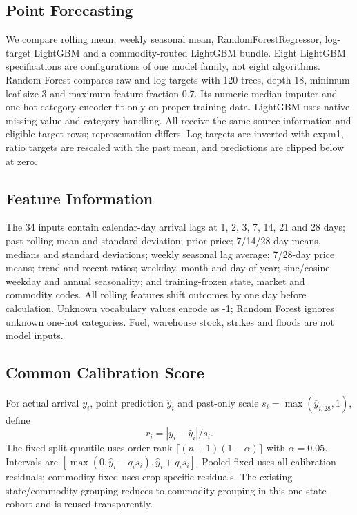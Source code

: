 \documentclass[conference]{IEEEtran}
\begin{document}
\subsection{Point Forecasting}
We compare rolling mean, weekly seasonal mean, RandomForestRegressor, log-target LightGBM and a commodity-routed LightGBM bundle. Eight LightGBM specifications are configurations of one model family, not eight algorithms. Random Forest compares raw and log targets with 120 trees, depth 18, minimum leaf size 3 and maximum feature fraction 0.7. Its numeric median imputer and one-hot category encoder fit only on proper training data. LightGBM uses native missing-value and category handling. All receive the same source information and eligible target rows; representation differs. Log targets are inverted with expm1, ratio targets are rescaled with the past mean, and predictions are clipped below at zero.
\subsection{Feature Information}
The 34 inputs contain calendar-day arrival lags at 1, 2, 3, 7, 14, 21 and 28 days; past rolling mean and standard deviation; prior price; 7/14/28-day means, medians and standard deviations; weekly seasonal lag average; 7/28-day price means; trend and recent ratios; weekday, month and day-of-year; sine/cosine weekday and annual seasonality; and training-frozen state, market and commodity codes. All rolling features shift outcomes by one day before calculation. Unknown vocabulary values encode as -1; Random Forest ignores unknown one-hot categories. Fuel, warehouse stock, strikes and floods are not model inputs.
\subsection{Common Calibration Score}
For actual arrival $y_i$, point prediction $\hat y_i$ and past-only scale $s_i=\max(\overline y_{i,28},1)$, define
\begin{equation}r_i=|y_i-\hat y_i|/s_i.\end{equation}
The fixed split quantile uses order rank $\lceil(n+1)(1-\alpha)\rceil$ with $\alpha=0.05$. Intervals are $[\max(0,\hat y_i-q_i s_i),\hat y_i+q_i s_i]$. Pooled fixed uses all calibration residuals; commodity fixed uses crop-specific residuals. The existing state/commodity grouping reduces to commodity grouping in this one-state cohort and is reused transparently.
\end{document}
